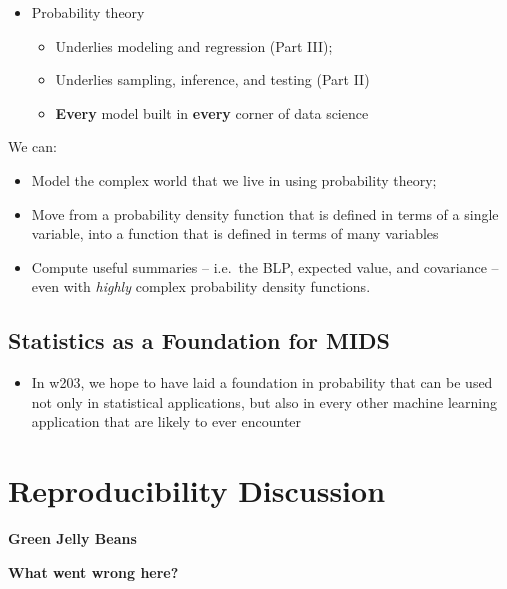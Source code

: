 \documentclass[
]{book}
\providecommand{\tightlist}{%
  \setlength{\itemsep}{0pt}\setlength{\parskip}{0pt}}
\theoremstyle{definition}
\theoremstyle{definition}
\theoremstyle{definition}
\theoremstyle{definition}
\theoremstyle{remark}
\begin{document}
\begin{itemize}
\tightlist
\item
  Probability theory

  \begin{itemize}
  \tightlist
  \item
    Underlies modeling and regression (Part III);
  \item
    Underlies sampling, inference, and testing (Part II)
  \item
    \textbf{Every} model built in \textbf{every} corner of data science
  \end{itemize}
\end{itemize}

We can:

\begin{itemize}
\tightlist
\item
  Model the complex world that we live in using probability theory;
\item
  Move from a probability density function that is defined in terms of a single variable, into a function that is defined in terms of many variables
\item
  Compute useful summaries -- i.e.~the BLP, expected value, and covariance -- even with \emph{highly} complex probability density functions.
\end{itemize}

\hypertarget{statistics-as-a-foundation-for-mids}{%
\subsection{Statistics as a Foundation for MIDS}\label{statistics-as-a-foundation-for-mids}}

\begin{itemize}
\tightlist
\item
  In w203, we hope to have laid a foundation in probability that can be used not only in statistical applications, but also in every other machine learning application that are likely to ever encounter
\end{itemize}

\hypertarget{reproducibility-discussion}{%
\section{Reproducibility Discussion}\label{reproducibility-discussion}}

\textbf{Green Jelly Beans}

\textbf{What went wrong here?}
\end{document}
